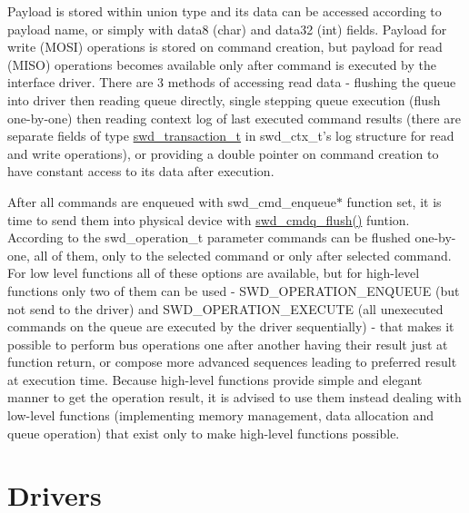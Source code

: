 Payload is stored within union type and its data can be accessed according to payload name, or simply with data8 (char) and data32 (int) fields. Payload for write (MOSI) operations is stored on command creation, but payload for read (MISO) operations becomes available only after command is executed by the interface driver. There are 3 methods of accessing read data -\/ flushing the queue into driver then reading queue directly, single stepping queue execution (flush one-\/by-\/one) then reading context log of last executed command results (there are separate fields of type \hyperlink{structswd__transaction__t}{swd\_\-transaction\_\-t} in swd\_\-ctx\_\-t's log structure for read and write operations), or providing a double pointer on command creation to have constant access to its data after execution.

After all commands are enqueued with swd\_\-cmd\_\-enqueue$\ast$ function set, it is time to send them into physical device with \hyperlink{libswd_8c_ad53379f5a7756cc91b01e867aaaa489d}{swd\_\-cmdq\_\-flush()} funtion. According to the swd\_\-operation\_\-t parameter commands can be flushed one-\/by-\/one, all of them, only to the selected command or only after selected command. For low level functions all of these options are available, but for high-\/level functions only two of them can be used -\/ SWD\_\-OPERATION\_\-ENQUEUE (but not send to the driver) and SWD\_\-OPERATION\_\-EXECUTE (all unexecuted commands on the queue are executed by the driver sequentially) -\/ that makes it possible to perform bus operations one after another having their result just at function return, or compose more advanced sequences leading to preferred result at execution time. Because high-\/level functions provide simple and elegant manner to get the operation result, it is advised to use them instead dealing with low-\/level functions (implementing memory management, data allocation and queue operation) that exist only to make high-\/level functions possible.\hypertarget{index_doc_drivers}{}\section{Drivers}\label{index_doc_drivers}
